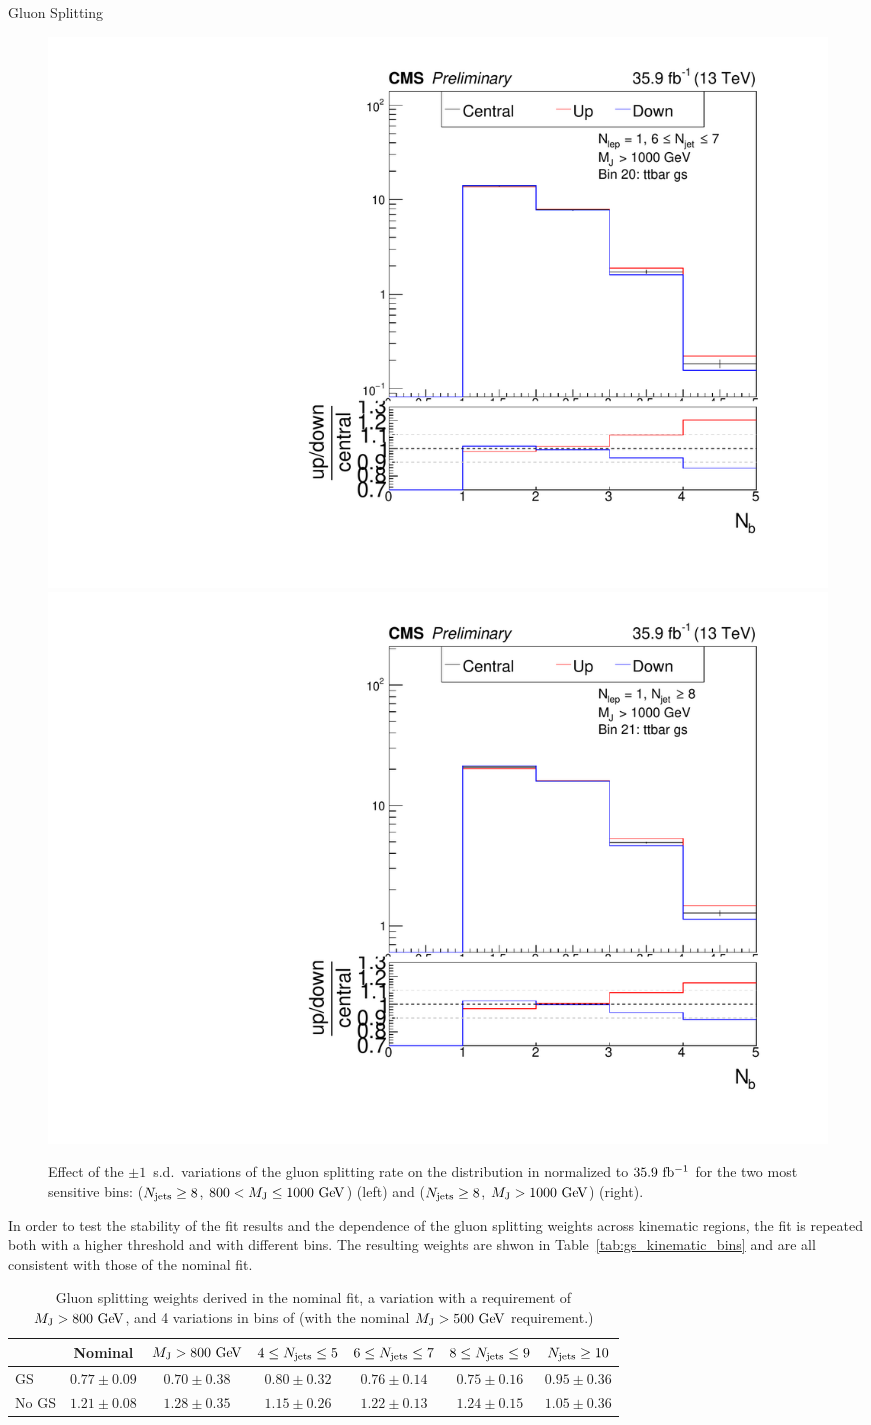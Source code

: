 \begin{section}{Gluon Splitting}
\begin{figure}[tbp!]
\begin{center}
\includegraphics[angle=0,width=0.45\columnwidth]{fig/bin20_ttbar_gs_mconly.pdf}
\includegraphics[angle=0,width=0.45\columnwidth]{fig/bin21_ttbar_gs_mconly.pdf}
\end{center}
\caption{Effect of the $\pm 1$~s.d.\ variations of the gluon splitting rate on the \Nb distribution in \ttbar normalized to $35.9~\mathrm{fb^{-1}}$ for the two most sensitive bins: ($N_{\mathrm{jets}} \geq 8$, $800 < M_\mathrm{J} \leq 1000~\mathrm{Ge\kern -0.1em V}$) (left) and ($N_{\mathrm{jets}} \geq 8$, $M_\mathrm{J} > 1000~\mathrm{Ge\kern -0.1em V}$) (right).}
\label{fig:gs_variations}
\end{figure}

In order to test the stability of the fit results and the dependence of the gluon splitting weights across kinematic regions, the \dRbb fit is repeated both with a higher \MJ threshold and with different \Njets bins. 
The resulting weights are shwon in Table~\ref{tab:gs_kinematic_bins} and are all consistent with those of the nominal fit.

\begin{table}[tb!]
\setlength\tabcolsep{3pt}
\centering
\begin{tabular}{l|cccccc}
 & Nominal & $M_\mathrm{J} > 800~\mathrm{Ge\kern -0.1em V}$ & $4 \leq N_{\mathrm{jets}} \leq 5$ & $6 \leq N_{\mathrm{jets}} \leq 7$ & $8 \leq N_{\mathrm{jets}} \leq 9$ & $N_{\mathrm{jets}} \geq 10$ \\
\hline
GS    & $0.77 \pm 0.09$ & $0.70 \pm 0.38$ & $ 0.80 \pm 0.32$  & $ 0.76 \pm 0.14$ & $ 0.75 \pm 0.16$  & $ 0.95 \pm 0.36$ \\
No GS & $1.21 \pm 0.08$ & $1.28 \pm 0.35$ & $ 1.15 \pm 0.26$  & $ 1.22 \pm 0.13$ & $ 1.24 \pm 0.15$  & $ 1.05 \pm 0.36$ \\
\end{tabular}
\caption{Gluon splitting weights derived in the nominal fit, a variation with a requirement of $M_\mathrm{J} > 800~\mathrm{Ge\kern -0.1em V}$, and 4 variations in bins of \Njets (with the nominal $M_\mathrm{J} > 500~\mathrm{Ge\kern -0.1em V}$ requirement.)}
\label{tab:GS_variations}
\end{table}

\end{section}

